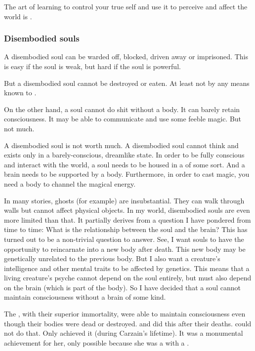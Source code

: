 The art of learning to control your true self and use it to perceive and affect the world is \emph{}. 





\subsubsection{Disembodied souls}
A disembodied soul can be warded off, blocked, driven away or imprisoned. 
This is easy if the soul is weak, but hard if the soul is powerful. 

But a disembodied soul cannot be destroyed or eaten. 
At least not by any means known to \Miithians. 

On the other hand, a soul cannot do shit without a body. 
It can barely retain consciousness. 
It may be able to communicate and use some feeble magic. 
But not much. 

A disembodied soul is not worth much.
A disembodied soul cannot think and exists only in a barely-conscious, dreamlike state.
In order to be fully conscious and interact with the world, a soul needs to be housed in a  of some sort. And a brain needs to be supported by a body.
Furthermore, in order to cast magic, you need a body to channel the magical energy.

In many stories, ghosts (for example) are insubstantial. They can walk through walls but cannot affect physical objects.
In my world, disembodied souls are even more limited than that.
It partially derives from a question I have pondered from time to time: What is the relationship between the soul and the brain?
This has turned out to be a non-trivial question to answer. 
See, I want souls to have the opportunity to reincarnate into a new body after death. This new body may be genetically unrelated to the previous body.
But I also want a creature's intelligence and other mental traits to be affected by genetics.
This means that a living creature's psyche cannot depend on the soul entirely, but must also depend on the brain (which is part of the body). 
So I have decided that a soul cannot maintain consciousness without a brain of some kind.

The \dragons, with their superior immortality, were able to maintain consciousness even though their bodies were dead or destroyed. 
\Sethicus and \Tiamat did this after their deaths.
\Resphain could not do that. 
Only \Shiaraid achieved it (during Carzain's lifetime). 
It was a monumental achievement for her, only possible because she was a \sathariah \malach with a \carcer.









